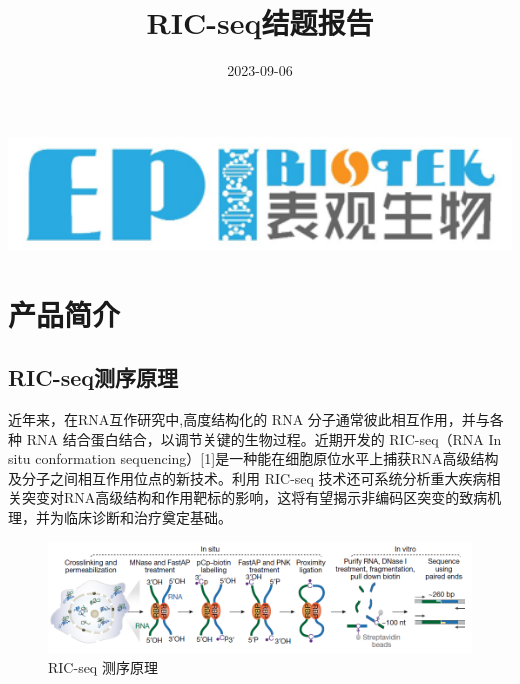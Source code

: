 \documentclass[
]{ctexart}
\title{RIC-seq结题报告}
\author{}
\date{\vspace{-2.5em}2023-09-06}
\begin{document}
\maketitle

\setlength{\parindent}{2em}

\vspace{30pt}

\begin{center}\includegraphics[width=5.46in]{./1.picture/0.epibiotek_log} \end{center}
\vspace{120pt}

\newpage
\tableofcontents
\newpage

\hypertarget{ux4ea7ux54c1ux7b80ux4ecb}{%
\section{产品简介}\label{ux4ea7ux54c1ux7b80ux4ecb}}

\hypertarget{ric-sequx6d4bux5e8fux539fux7406}{%
\subsection{RIC-seq测序原理}\label{ric-sequx6d4bux5e8fux539fux7406}}

近年来，在RNA互作研究中,高度结构化的 RNA 分子通常彼此相互作用，并与各种 RNA 结合蛋白结合，以调节关键的生物过程。近期开发的 RIC-seq（RNA In situ conformation sequencing）{[}1{]}是一种能在细胞原位水平上捕获RNA高级结构及分子之间相互作用位点的新技术。利用 RIC-seq 技术还可系统分析重大疾病相关突变对RNA高级结构和作用靶标的影响，这将有望揭示非编码区突变的致病机理，并为临床诊断和治疗奠定基础。

\begin{figure}[H]

{\centering \includegraphics[width=0.8\linewidth]{./1.picture/1.1.ExperimentalProcess} 

}

\caption{RIC-seq 测序原理}\label{fig:unnamed-chunk-2}
\end{figure}
\end{document}
